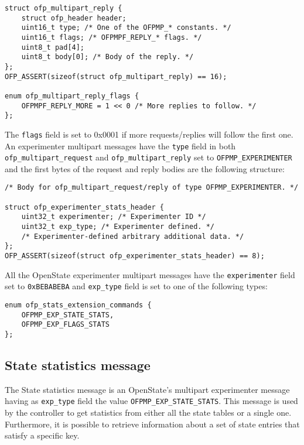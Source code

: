 \begin{verbatim}
struct ofp_multipart_reply {
    struct ofp_header header;
    uint16_t type; /* One of the OFPMP_* constants. */
    uint16_t flags; /* OFPMPF_REPLY_* flags. */
    uint8_t pad[4];
    uint8_t body[0]; /* Body of the reply. */
};
OFP_ASSERT(sizeof(struct ofp_multipart_reply) == 16);

enum ofp_multipart_reply_flags {
    OFPMPF_REPLY_MORE = 1 << 0 /* More replies to follow. */
};
\end{verbatim}
The \texttt{flags} field is set to 0x0001 if more requests/replies will follow the first one. An experimenter multipart messages have the \texttt{type} field in both \texttt{ofp\_multipart\_request} and \texttt{ofp\_multipart\_reply} set to \texttt{OFPMP\_EXPERIMENTER} and the first bytes of the request and reply bodies are the following structure:

\begin{verbatim}
/* Body for ofp_multipart_request/reply of type OFPMP_EXPERIMENTER. */

struct ofp_experimenter_stats_header {
    uint32_t experimenter; /* Experimenter ID */
    uint32_t exp_type; /* Experimenter defined. */
    /* Experimenter-defined arbitrary additional data. */
};
OFP_ASSERT(sizeof(struct ofp_experimenter_stats_header) == 8);
\end{verbatim}
All the OpenState experimenter multipart messages have the \texttt{experimenter} field set to \texttt{0xBEBABEBA} and \texttt{exp\_type} field is set to one of the following types:

\begin{verbatim}
enum ofp_stats_extension_commands {
    OFPMP_EXP_STATE_STATS,      
    OFPMP_EXP_FLAGS_STATS
};
\end{verbatim}
\subsection{State statistics message}

The State statistics message is an OpenState's multipart experimenter message having as \texttt{exp\_type} field the value \texttt{OFPMP\_EXP\_STATE\_STATS}.
This message is used by the controller to get statistics from either all the state tables or a single one. Furthermore, it is possible to retrieve information about a set of state entries that satisfy a specific key.

